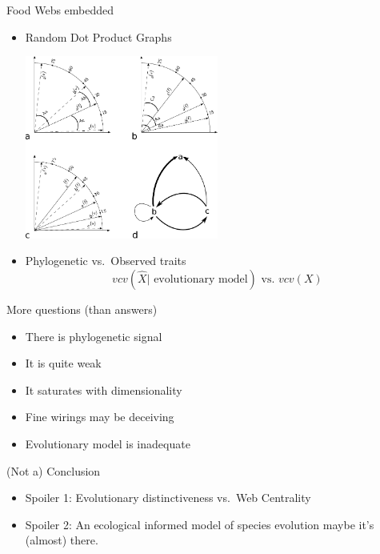 \documentclass[ignorenonframetext,]{beamer}
\begin{document}
\begin{frame}{Food Webs embedded}

\begin{itemize}[<+->]
\item Random Dot Product Graphs
  \begin{centering}
  \includegraphics[width=0.5\textwidth]{images/RDPGmodel.pdf}
  \end{centering}

\item Phylogenetic vs.~Observed traits
  \begin{equation*}
    vcv\left( \hat{X} | \mbox{ evolutionary model} \right) \mbox{ vs. } vcv\left(X\right)
  \end{equation*}
\end{itemize}

\end{frame}

\begin{frame}{More questions (than answers)}

\begin{itemize}[<+->]
\itemsep1pt\parskip0pt
\item
  There is phylogenetic signal
\item
  It is quite weak
\item
  It saturates with dimensionality
\item
  Fine wirings may be deceiving
\item
  Evolutionary model is inadequate
\end{itemize}

\end{frame}

\begin{frame}{(Not a) Conclusion}

\begin{itemize}[<+->]
\item
  Spoiler 1: Evolutionary distinctiveness vs.~Web Centrality
\item
  Spoiler 2: An ecological informed model of species evolution maybe
  it's (almost) there.
\end{itemize}

\end{frame}
\end{document}
